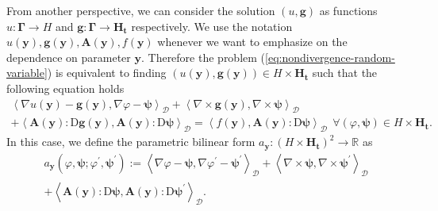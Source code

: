 \documentclass[final,onefignum,onetabnum]{mousaviart}
\begin{document}
	\vspace*{1mm}
	From another perspective, we can consider the solution $(u, \boldsymbol{g})$ as functions $u:\boldsymbol{\Gamma}\rightarrow H$ and $\boldsymbol{g}: \boldsymbol{\Gamma}\rightarrow \boldsymbol{H}_{\boldsymbol{t}}$ respectively. We use the notation $u(\boldsymbol{y}), \boldsymbol{g}(\boldsymbol{y}),  \boldsymbol{A}(\boldsymbol{y}), f(\boldsymbol{y})$ whenever we want to emphasize on the dependence on parameter $\boldsymbol{y}$. Therefore the problem (\ref{eq:nondivergence-random-variable}) is equivalent to finding $\left( u(\boldsymbol{y}), \boldsymbol{g}(\boldsymbol{y}) \right) \in H \times \boldsymbol{H}_{\boldsymbol{t}}$ such that the following equation holds
	\begin{multline}
		\label{eq:Euler-Lagrange-parametric}
		\left\langle \nabla u (\boldsymbol{y}) - \boldsymbol{g} (\boldsymbol{y}), \nabla\varphi - \boldsymbol{\psi} \right\rangle_{\mathcal{D}}  
		+
		\left\langle  \nabla \times \boldsymbol{g}(\boldsymbol{y}), \nabla \times \boldsymbol{\psi} \right\rangle_{\mathcal{D}} 
		\\
		+
		\left\langle  \boldsymbol{A}(\boldsymbol{y}):\mathrm{D} \boldsymbol{g}(\boldsymbol{y}), \boldsymbol{A}(\boldsymbol{y}):\mathrm{D} \boldsymbol{\psi} \right\rangle_{\mathcal{D}} 
		= 
		\left\langle  f(\boldsymbol{y}), \boldsymbol{A}(\boldsymbol{y}):\mathrm{D} \boldsymbol{\psi} \right\rangle_{\mathcal{D}} 
		~~
		\forall (\varphi, \boldsymbol{\psi}) \in 
		H \times \boldsymbol{H}_{\boldsymbol{t}} .
	\end{multline}
	In this case, we define the parametric bilinear form $	a_{\boldsymbol{y}}: \left( H \times \boldsymbol{H}_{\boldsymbol{t}} \right)^2  \rightarrow \mathbb{R}$ as
	\begin{multline}
		\label{def:parametric-bilinear-a}
		a_{\boldsymbol{y}} (\varphi, \boldsymbol{\psi}; \varphi^{\prime}, \boldsymbol{\psi}^{\prime}):=
		\left\langle \nabla\varphi - \boldsymbol{\psi} , \nabla\varphi^{\prime} - \boldsymbol{\psi}^{\prime}  \right\rangle_{\mathcal{D}}  
		+
		\left\langle  \nabla \times \boldsymbol{\psi}, \nabla \times \boldsymbol{\psi}^{\prime} \right\rangle_{\mathcal{D}} 
		\\
		+
		\left\langle  \boldsymbol{A}(\boldsymbol{y}):\mathrm{D}\boldsymbol{\psi}, \boldsymbol{A}(\boldsymbol{y}):\mathrm{D}\boldsymbol{\psi}^{\prime} \right\rangle_{\mathcal{D}}. 
	\end{multline}
	
\end{document}
